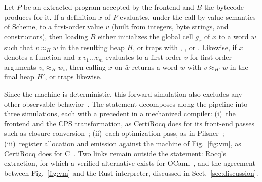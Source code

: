 \begin{conjecture}
\label{conj:correct}
Let $P$ be an extracted program accepted by the frontend and $B$ the bytecode \encore{} produces for it.
If a definition $x$ of $P$ evaluates, under the call-by-value semantics of Scheme, to a first-order value $v$ (built from integers, byte strings, and constructors), then loading $B$ either initializes the global cell $g_x$ of $x$ to a word $w$ such that $v \approx_H w$ in the resulting heap $H$, or traps with , , or .
Likewise, if $x$ denotes a function and $x\ v_1 \dots v_m$ evaluates to a first-order $v$ for first-order arguments $v_i \approx_H w_i$, then calling $x$ on $\bar{w}$ returns a word $w$ with $v \approx_{H'} w$ in the final heap $H'$, or traps likewise.
\end{conjecture}

\noindent
Since the machine is deterministic, this forward simulation also excludes any other observable behavior~\cite{leroy2009mechanized}.
The statement decomposes along the pipeline into three simulations, each with a precedent in a mechanized compiler:
(i)~the frontend and the CPS transformation, as CertiRocq does for its front-end passes such as closure conversion~\cite{paraskevopoulou2019closure};
(ii)~each optimization pass, as in Pilsner~\cite{neis2015pilsner};
(iii)~register allocation and emission against the machine of Fig.~\ref{fig:vm}, as CertiRocq does for C~\cite{savarybelanger2019cpstoc}.
Two links remain outside the statement: Rocq's extraction, for which a verified alternative exists for OCaml~\cite{forster2024verified}, and the agreement between Fig.~\ref{fig:vm} and the Rust interpreter, discussed in Sect.~\ref{sec:discussion}.

\FloatBarrier
